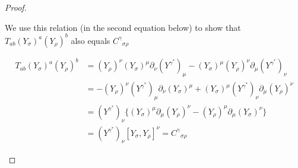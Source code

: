 \begin{proof}
\begin{enumerate}[label=(\alph*)]
    We use this relation (in the second equation below) to show that $T_{ab}(Y_\sigma)^a(Y_\rho)^b$ also equals ${C^\gamma}_{\sigma\rho}$

    \[\begin{aligned}
        T_{ab}(Y_\sigma)^{a}(Y_\rho)^b&=(Y_\rho)^\nu(Y_\sigma)^\mu\partial_\nu(Y^{\gamma^*})_\mu-(Y_\sigma)^\mu(Y_\rho)^\nu\partial_\mu(Y^{\gamma^*})_\nu  \\
        &=-(Y_\rho)^\nu(Y^{\gamma^*})_\mu\partial_\nu(Y_\sigma)^\mu+(Y_\sigma)^\mu(Y^{\gamma^*})_\nu\partial_\mu(Y_\rho)^\nu \\
        &=(Y^{\gamma^*})_\nu\{(Y_\sigma)^\mu\partial_\mu(Y_\rho)^\nu-(Y_\rho)^\mu\partial_\mu(Y_\sigma)^\nu\} \\
        &=(Y^{\gamma^*})_\nu[Y_\sigma,Y_\rho]^\nu={C^\gamma}_{\sigma\rho}
    \end{aligned}\]
\end{enumerate}
\end{proof}

